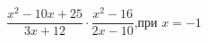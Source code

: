 \begin{ex}[type=expr_calc]
	\begin{condition}
		\( \dfrac{x^2-10x+25}{3x+12}\cdot\dfrac{x^2-16}{2x-10} \),\quad при \( x=-1 \)
	\end{condition}
\end{ex}